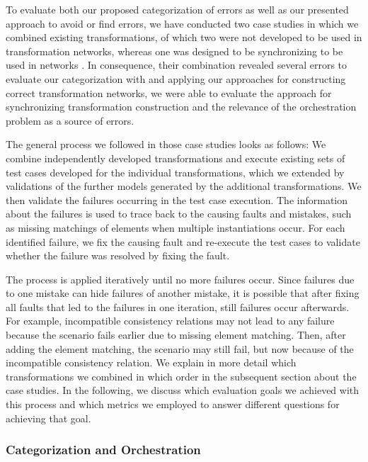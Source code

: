 To evaluate both our proposed categorization of errors as well as our presented approach to avoid or find errors, we have conducted two case studies in which we combined existing transformations, of which two were not developed to be used in transformation networks, whereas one was designed to be synchronizing to be used in networks .
In consequence, their combination revealed several errors to evaluate our categorization with and applying our approaches for constructing correct transformation networks, we were able to evaluate the approach for synchronizing transformation construction and the relevance of the orchestration problem as a source of errors.

The general process we followed in those case studies looks as follows:
We combine independently developed transformations and execute existing sets of test cases developed for the individual transformations, which we extended by validations of the further models generated by the additional transformations.
We then validate the failures occurring in the test case execution.
The information about the failures is used to trace back to the causing faults and mistakes, such as missing matchings of elements when multiple instantiations occur.
For each identified failure, we fix the causing fault and re-execute the test cases to validate whether the failure was resolved by fixing the fault.

The process is applied iteratively until no more failures occur.
Since failures due to one mistake can hide failures of another mistake, it is possible that after fixing all faults that led to the failures in one iteration, still failures occur afterwards.
For example, incompatible consistency relations may not lead to any failure because the scenario fails earlier due to missing element matching. Then, after adding the element matching, the scenario may still fail, but now because of the incompatible consistency relation.
We explain in more detail which transformations we combined in which order in the subsequent section about the case studies.
In the following, we discuss which evaluation goals we achieved with this process and which metrics we employed to answer different questions for achieving that goal.


\subsubsection{Categorization and Orchestration}

